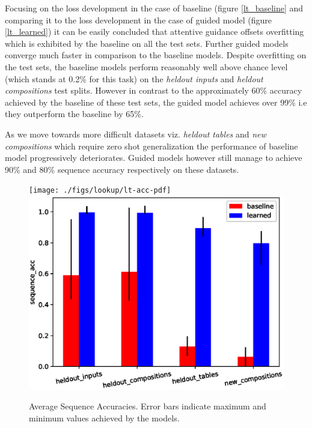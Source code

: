 Focusing on the loss development in the case of baseline (figure \ref{lt_baseline} and comparing it to the loss development in the case of guided model (figure \ref{lt_learned}) it can be easily concluded that attentive guidance offsets overfitting which is exhibited by the baseline on all the test sets. Further guided models converge much faster in comparison to the baseline models. Despite overfitting on the test sets, the baseline models perform reasonably well above chance level (which stands at 0.2\% for this task) on the \textit{heldout inputs} and \textit{heldout compositions} test splits. However in contrast to the approximately 60\% accuracy achieved by the baseline of these test sets, the guided model achieves over 99\% i.e they outperform the baseline by 65\%.

As we move towards more difficult datasets viz. \textit{heldout tables} and \textit{new compositions} which require zero shot generalization the performance of baseline model progressively deteriorates. Guided models however still manage to achieve 90\% and 80\% sequence accuracy respectively on these datasets. 

\begin{figure}[H]
	\begin{minipage}[t]{\textwidth}
		\centering
		\ifpdf
		\texttt{[image: ./figs/lookup/lt-acc-pdf]}
		\else
		\includegraphics[width=\linewidth,keepaspectratio=true]{./figs/lookup/lt-acc-eps}
		\fi
		\caption{\small Average Sequence Accuracies. Error bars indicate maximum and minimum values achieved by the models.}
		\label{res:lt-acc}
	\end{minipage}
\end{figure}

